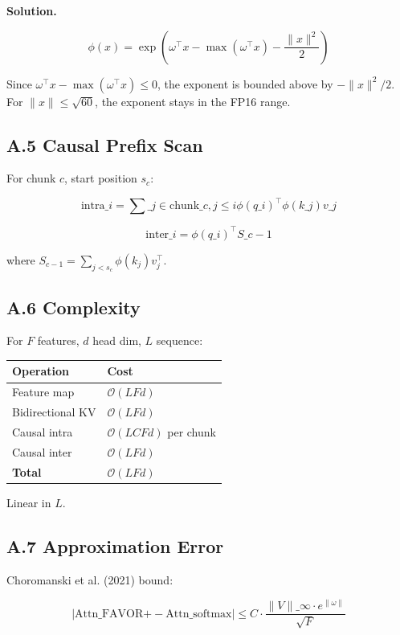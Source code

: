 \textbf{Solution.}

\[
\phi(x) = \exp\!\left(\omega^\top x - \max(\omega^\top x) - \frac{\|x\|^2}{2}\right)
\tag{A.5}
\]

Since $\omega^\top x - \max(\omega^\top x) \leq 0$, the exponent is bounded 
above by $-\|x\|^2/2$. For $\|x\| \leq \sqrt{60}$, the exponent stays in 
the FP16 range.

\subsection{A.5 Causal Prefix Scan}

For chunk $c$, start position $s_c$:

\[
\text{intra}\_i = \sum\_{j \in \text{chunk}\_c, j \leq i} \phi(q\_i)^\top \phi(k\_j) v\_j
\tag{A.6}
\]

\[
\text{inter}\_i = \phi(q\_i)^\top S\_{c-1}
\tag{A.7}
\]

where $S_{c-1} = \sum_{j < s_c} \phi(k_j) v_j^\top$.

\subsection{A.6 Complexity}

For $F$ features, $d$ head dim, $L$ sequence:

\begin{table}[H]
\centering
\small
\begin{tabular}{ll}
\toprule
\textbf{Operation} & \textbf{Cost} \\
\midrule
Feature map & $\mathcal{O}(L F d)$ \\
Bidirectional KV & $\mathcal{O}(L F d)$ \\
Causal intra & $\mathcal{O}(L C F d)$ per chunk \\
Causal inter & $\mathcal{O}(L F d)$ \\
\textbf{Total} & $\mathcal{O}(L F d)$ \\
\bottomrule
\end{tabular}
\end{table}

Linear in $L$.

\subsection{A.7 Approximation Error}

Choromanski et al. (2021) bound:

\[
\left|\text{Attn}\_{\text{FAVOR+}} - \text{Attn}\_{\text{softmax}}\right| \leq C \cdot \frac{\|V\|\_\infty \cdot e^{\|\omega\|}}{\sqrt{F}}
\tag{A.8}
\]

